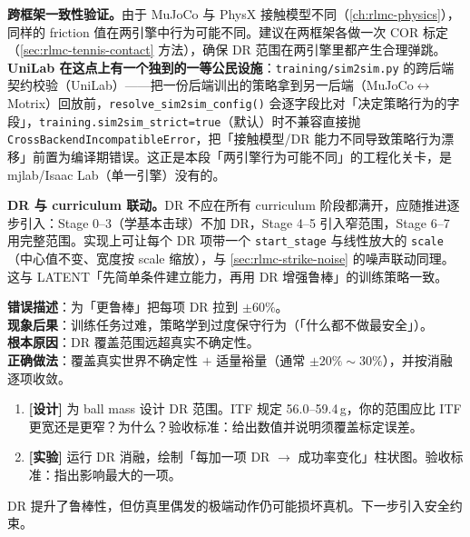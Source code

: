 \textbf{跨框架一致性验证。}由于 MuJoCo 与 PhysX 接触模型不同（\cref{ch:rlmc-physics}），同样的 friction 值在两引擎中行为可能不同。建议在两框架各做一次 COR 标定（\cref{sec:rlmc-tennis-contact} 方法），确保 DR 范围在两引擎里都产生合理弹跳。\textbf{UniLab 在这点上有一个独到的一等公民设施}：\verb|training/sim2sim.py| 的跨后端契约校验（UniLab）——把一份后端训出的策略拿到另一后端（MuJoCo$\leftrightarrow$Motrix）回放前，\verb|resolve_sim2sim_config()| 会逐字段比对「决定策略行为的字段」，\verb|training.sim2sim_strict=true|（默认）时不兼容直接抛 \verb|CrossBackendIncompatibleError|，把「接触模型/DR 能力不同导致策略行为漂移」前置为编译期错误。这正是本段「两引擎行为可能不同」的工程化关卡，是 mjlab/Isaac Lab（单一引擎）没有的。

\textbf{DR 与 curriculum 联动。}DR 不应在所有 curriculum 阶段都满开，应随推进逐步引入：Stage 0--3（学基本击球）不加 DR，Stage 4--5 引入窄范围，Stage 6--7 用完整范围。实现上可让每个 DR 项带一个 \verb|start_stage| 与线性放大的 \verb|scale|（中心值不变、宽度按 scale 缩放），与 \cref{sec:rlmc-strike-noise} 的噪声联动同理。这与 LATENT「先简单条件建立能力，再用 DR 增强鲁棒」的训练策略一致。

\begin{pitfall}[DR 范围越宽越好]
\textbf{错误描述}：为「更鲁棒」把每项 DR 拉到 $\pm 60\%$。\\
\textbf{现象后果}：训练任务过难，策略学到过度保守行为（「什么都不做最安全」）。\\
\textbf{根本原因}：DR 覆盖范围远超真实不确定性。\\
\textbf{正确做法}：覆盖真实世界不确定性 $+$ 适量裕量（通常 $\pm 20\%\sim30\%$），并按消融逐项收敛。
\end{pitfall}

\begin{practice}[本节动手任务]
\begin{enumerate}
  \item \textbf{[设计]} 为 ball mass 设计 DR 范围。ITF 规定 56.0--59.4\,g，你的范围应比 ITF 更宽还是更窄？为什么？验收标准：给出数值并说明须覆盖标定误差。
  \item \textbf{[实验]} 运行 DR 消融，绘制「每加一项 DR $\to$ 成功率变化」柱状图。验收标准：指出影响最大的一项。
\end{enumerate}
\end{practice}

\noindent{}DR 提升了鲁棒性，但仿真里偶发的极端动作仍可能损坏真机。下一步引入安全约束。

